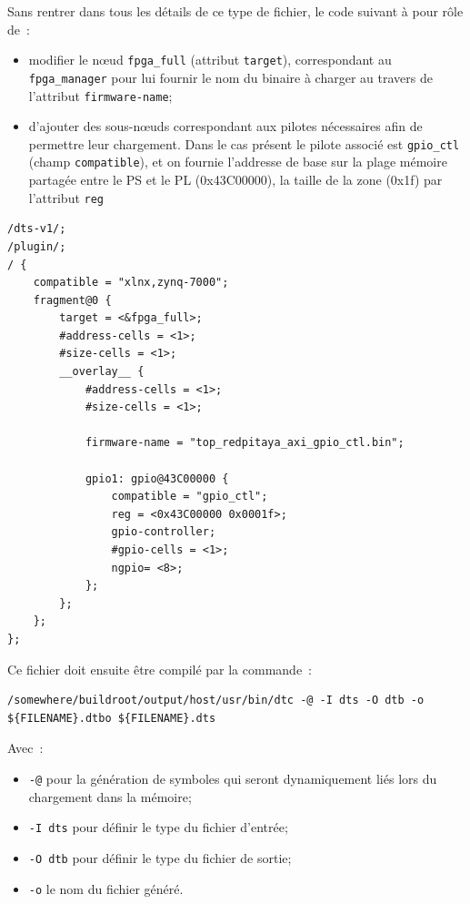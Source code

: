 \documentclass[12pt,oneside]{article}
\begin{document}
Sans rentrer dans tous les d\'etails de ce type de fichier, le code suivant \`a
pour r\^ole de~:
\begin{itemize}
\item modifier le n\oe ud {\tt fpga\_full} (attribut {\tt target}), correspondant au {\tt fpga\_manager}
	pour lui fournir le nom du binaire \`a charger au travers de l'attribut
	{\tt firmware-name};
\item d'ajouter des sous-n\oe uds correspondant aux pilotes n\'ecessaires afin
de permettre leur chargement. Dans le cas pr\'esent le pilote associ\'e est
{\tt gpio\_ctl} (champ {\tt compatible}), et on fournie l'addresse de base sur
la plage m\'emoire partag\'ee entre le PS et le PL (0x43C00000), la taille de
la zone (0x1f) par l'attribut {\tt reg}
\end{itemize}\vspace{0.3cm}
 
\begin{lstlisting}
/dts-v1/;
/plugin/;
/ {
    compatible = "xlnx,zynq-7000";
    fragment@0 {
        target = <&fpga_full>;
        #address-cells = <1>;
        #size-cells = <1>;
        __overlay__ {
            #address-cells = <1>;
            #size-cells = <1>;

            firmware-name = "top_redpitaya_axi_gpio_ctl.bin";

            gpio1: gpio@43C00000 {
                compatible = "gpio_ctl";
                reg = <0x43C00000 0x0001f>;
                gpio-controller;
                #gpio-cells = <1>;
                ngpio= <8>;
            };
        };
    };
};

\end{lstlisting}

Ce fichier doit ensuite \^etre compil\'e par la commande~:
\begin{lstlisting}
/somewhere/buildroot/output/host/usr/bin/dtc -@ -I dts -O dtb -o ${FILENAME}.dtbo ${FILENAME}.dts
\end{lstlisting}
Avec~:
\begin{itemize}
\item {\tt -@} pour la g\'en\'eration de symboles qui seront dynamiquement
li\'es lors du chargement dans la m\'emoire;
\item {\tt -I dts} pour d\'efinir le type du fichier d'entr\'ee;
\item {\tt -O dtb} pour d\'efinir le type du fichier de sortie;
\item {\tt -o} le nom du fichier g\'en\'er\'e.
\end{itemize}
\end{document}
